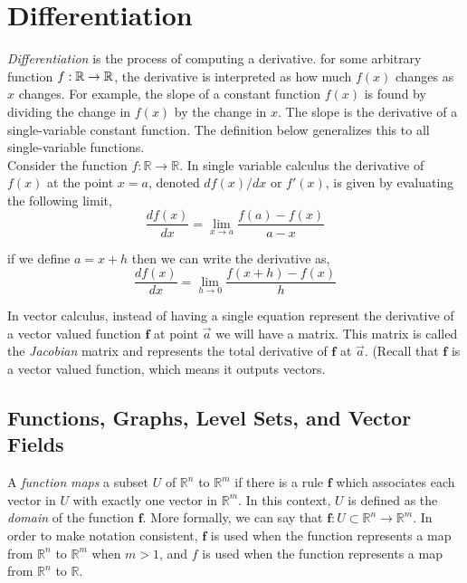 \documentclass[12pt]{article}
\begin{document}
\pagebreak
\section{Differentiation}

\emph{Differentiation} is the process of computing a derivative. for some arbitrary function $f:\mathbb{R}\rightarrow\mathbb{R}$, the derivative is interpreted as how much $f(x)$ changes as $x$ changes. For example, the slope of a constant function $f(x)$ is found by dividing the change in $f(x)$ by the change in $x$. The slope is the derivative of a single-variable constant function. The definition below generalizes this to all single-variable functions. \\

Consider the function $f:\mathbb{R}\rightarrow\mathbb{R}$. In single variable calculus the derivative of $f(x)$ at the point $x=a$, denoted $df(x)/dx$ or $f'(x)$, is given by evaluating the following limit,
\[
\frac{df(x)}{dx}=\lim_{x\rightarrow a}\frac{f(a)-f(x)}{a-x}
\]

 if we define $a = x + h$ then we can write the derivative as,
\[
\frac{df(x)}{dx}=\lim_{h\rightarrow 0}\frac{f(x+h)-f(x)}{h}
\]

 In vector calculus, instead of having a single equation represent the derivative of a vector valued function $\mathbf{f}$ at point $\vec{a}$ we will have a matrix. This matrix is called the \emph{Jacobian} matrix and represents the total derivative of $\mathbf{f}$ at $\vec{a}$. (Recall that $\mathbf{f}$ is a vector valued function, which means it outputs vectors.\\ 

\subsection{Functions, Graphs, Level Sets, and Vector Fields}

 A \emph{function} \emph{maps} a subset $U$ of $\mathbb{R}^n$ to $\mathbb{R}^m$ if there is a rule $\mathbf{f}$ which associates each vector in $U$ with exactly one vector in $\mathbb{R}^m$. In this context, $U$ is defined as the \emph{domain} of the function $\mathbf{f}$. More formally, we can say that $\mathbf{f}:U\subset\mathbb{R}^n\rightarrow\mathbb{R}^m$. In order to make notation consistent, $\mathbf{f}$ is used when the function represents a map from $\mathbb{R}^n$ to $\mathbb{R}^m$ when $m>1$, and $f$ is used when the function represents a map from $\mathbb{R}^n$ to $\mathbb{R}$. \\
 
\end{document}
